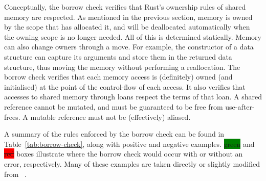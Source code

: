 \documentclass[11pt,a4paper,twoside,openany,draft]{report}
\newcommand{\goodexample}[1]{\colorbox{green}{#1}}
\newcommand{\badexample}[1]{\colorbox{red}{\sout{#1}}}
\begin{document}
Conceptually, the borrow check verifies that Rust's ownership rules of shared
memory are respected. As mentioned in the previous section, memory is owned by
the scope that has allocated it, and will be deallocated automatically when the
owning scope is no longer needed. All of this is determined statically. Memory
can also change owners through a move. For example, the constructor of a data
structure can capture its arguments and store them in the returned data
structure, thus moving the memory without performing a reallocation. The borrow
check verifies that each memory access is (definitely) owned (and initialised)
at the point of the control-flow of each access. It also verifies that accesses
to shared memory through loans respect the terms of that loan. A shared
reference cannot be mutated, and must be guaranteed to be free from
use-after-frees. A mutable reference must not be (effectively) aliased.

A summary of the rules enforced by the borrow check can be found in
Table~\ref{tab:borrow-check}, along with positive and negative examples.
\goodexample{green} and \badexample{red} boxes illustrate where the
borrow check would occur with or without an error, respectively. Many of these
examples are taken directly or slightly modified from
\citeauthor*{weiss_oxide:_2019}~\cite{weiss_oxide:_2019}.
\end{document}
